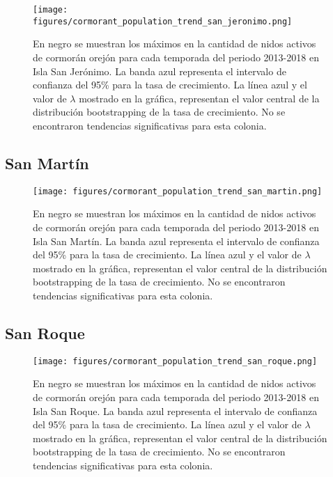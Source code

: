 \documentclass{article} %
\begin{document}
\begin{figure}[H]
\hspace{-2cm}
    \texttt{[image: figures/cormorant\_population\_trend\_san\_jeronimo.png]}
\caption{En negro se muestran los máximos en la cantidad de nidos activos de cormorán orejón para cada temporada del periodo 2013-2018 en Isla San Jerónimo. La banda azul representa el intervalo de confianza del 95\% para la tasa de crecimiento. La línea azul y el valor de $\lambda$ mostrado en la gráfica, representan el valor central de la distribución bootstrapping de la tasa de crecimiento. No se encontraron tendencias significativas para esta colonia.}
\end{figure}

\subsection*{San Martín}

\begin{figure}[H]
\hspace{-2cm}
    \texttt{[image: figures/cormorant\_population\_trend\_san\_martin.png]}
\caption{En negro se muestran los máximos en la cantidad de nidos activos de cormorán orejón para cada temporada del periodo 2013-2018 en Isla San Martín. La banda azul representa el intervalo de confianza del 95\% para la tasa de crecimiento. La línea azul y el valor de $\lambda$ mostrado en la gráfica, representan el valor central de la distribución bootstrapping de la tasa de crecimiento. No se encontraron tendencias significativas para esta colonia.}
\end{figure}

\subsection*{San Roque}

\begin{figure}[H]
\hspace{-2cm}
    \texttt{[image: figures/cormorant\_population\_trend\_san\_roque.png]}
\caption{En negro se muestran los máximos en la cantidad de nidos activos de cormorán orejón para cada temporada del periodo 2013-2018 en Isla San Roque. La banda azul representa el intervalo de confianza del 95\% para la tasa de crecimiento. La línea azul y el valor de $\lambda$ mostrado en la gráfica, representan el valor central de la distribución bootstrapping de la tasa de crecimiento. No se encontraron tendencias significativas para esta colonia.}
\end{figure}
\end{document}
